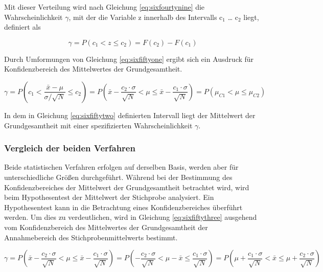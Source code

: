 \noindent Mit dieser Verteilung wird nach Gleichung \eqref{eq:sixfourtynine} die Wahrscheinlichkeit $\gamma$, mit der die Variable z innerhalb des Intervalls c$_{1}$ {\dots} c$_{2}$ liegt, definiert als

\begin{equation}\label{eq:sixfiftyone}
\gamma =P(c_{1} <z\le c_{2})=F(c_{2})-F(c_{1})
\end{equation}

\noindent Durch Umformungen von Gleichung \eqref{eq:sixfiftyone} ergibt sich ein Ausdruck f\"{u}r Konfidenzbereich des Mittelwertes der Grundgesamtheit.

\begin{equation}\label{eq:sixfiftytwo}
\gamma =P\left(c_{1} <\dfrac{\bar{x}-\mu }{\sigma /\sqrt{N}} \le c_{2} \right)=P\left(\bar{x}-\dfrac{c_{2} \cdot \sigma }{\sqrt{N}} <\mu \le \bar{x}-\dfrac{c_{1} \cdot \sigma }{\sqrt{N}} \right)=P\left(\mu _{C1} <\mu \le \mu _{C2} \right)
\end{equation}

\noindent In dem in Gleichung \eqref{eq:sixfiftytwo} definierten Intervall liegt der Mittelwert der Grundgesamtheit mit einer spezifizierten Wahrscheinlichkeit $\gamma$.

\subsubsection{Vergleich der beiden Verfahren}

\noindent Beide statistischen Verfahren erfolgen auf derselben Basis, werden aber f\"{u}r unterschiedliche Gr\"{o}{\ss}en durchgef\"{u}hrt. W\"{a}hrend bei der Bestimmung des Konfidenzbereiches der Mittelwert der Grundgesamtheit betrachtet wird, wird beim Hypothesentest der Mittelwert der Stichprobe analysiert. Ein Hypothesentest kann in die Betrachtung eines Konfidenzbereiches \"{u}berf\"{u}hrt werden. Um dies zu verdeutlichen, wird in Gleichung \eqref{eq:sixfiftythree} ausgehend vom Konfidenzbereich des Mittelwertes der Grundgesamtheit der Annahmebereich des Stichprobenmittelwerts bestimmt.

\begin{equation}\label{eq:sixfiftythree}
\gamma =P\left(\bar{x}-\dfrac{c_{2} \cdot \sigma }{\sqrt{N}} <\mu \le \bar{x}-\dfrac{c_{1} \cdot \sigma }{\sqrt{N}} \right)=P\left(-\dfrac{c_{2} \cdot \sigma }{\sqrt{N}} <\mu -\bar{x}\le \dfrac{c_{1} \cdot \sigma}{\sqrt{N}} \right)=P\left(\mu +\dfrac{c_{1} \cdot \sigma }{\sqrt{N}} <\bar{x}\le \mu +\dfrac{c_{2} \cdot \sigma }{\sqrt{N}} \right)
\end{equation}

